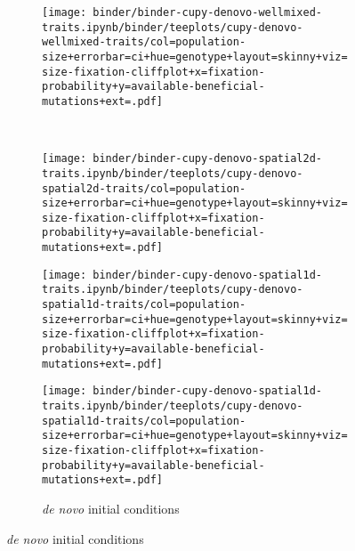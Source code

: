 \begin{figure}[h]
\begin{minipage}{\textwidth}
    \begin{subfigure}[b]{\linewidth}
        \begin{minipage}{0.3\textwidth}
          \texttt{[image: binder/binder-cupy-denovo-wellmixed-traits.ipynb/binder/teeplots/cupy-denovo-wellmixed-traits/col=population-size+errorbar=ci+hue=genotype+layout=skinny+viz=size-fixation-cliffplot+x=fixation-probability+y=available-beneficial-mutations+ext=.pdf]}%
        \end{minipage}%
        \begin{minipage}{0.06\textwidth}
          ~
        \end{minipage}%
        \begin{minipage}{0.26\textwidth}
          \texttt{[image: binder/binder-cupy-denovo-spatial2d-traits.ipynb/binder/teeplots/cupy-denovo-spatial2d-traits/col=population-size+errorbar=ci+hue=genotype+layout=skinny+viz=size-fixation-cliffplot+x=fixation-probability+y=available-beneficial-mutations+ext=.pdf]}%
        \end{minipage}%
        \begin{minipage}{0.25\textwidth}
          \texttt{[image: binder/binder-cupy-denovo-spatial1d-traits.ipynb/binder/teeplots/cupy-denovo-spatial1d-traits/col=population-size+errorbar=ci+hue=genotype+layout=skinny+viz=size-fixation-cliffplot+x=fixation-probability+y=available-beneficial-mutations+ext=.pdf]}%
        \end{minipage}%
      \begin{minipage}{0.12\textwidth}
        \raggedright
        \large
        \vspace{10ex}
        \caption{\textit{de novo} initial conditions}
        \label{fig:spatial-structure-1d-uncropped:denovo}

        \texttt{[image: binder/binder-cupy-denovo-spatial1d-traits.ipynb/binder/teeplots/cupy-denovo-spatial1d-traits/col=population-size+errorbar=ci+hue=genotype+layout=skinny+viz=size-fixation-cliffplot+x=fixation-probability+y=available-beneficial-mutations+ext=.pdf]}%
      \end{minipage}%
    \end{subfigure}%


\end{minipage}
\end{figure}
